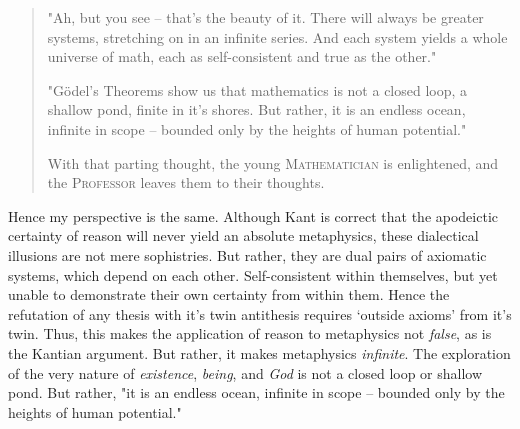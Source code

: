 \begin{quote}
  "Ah, but you see -- that's the beauty of it. There will always be greater systems, stretching on in an infinite series. And each system yields a whole universe of math, each as self-consistent and true as the other."

  "Gödel's Theorems show us that mathematics is not a closed loop, a shallow pond, finite in it's shores. But rather, it is an endless ocean, infinite in scope -- bounded only by the heights of human potential."

  With that parting thought, the young \textsc{Mathematician} is enlightened, and the \textsc{Professor} leaves them to their thoughts.
\end{quote}

\noindent
Hence my perspective is the same. Although Kant is correct that the apodeictic certainty of reason will never yield an absolute metaphysics, these dialectical illusions are not mere sophistries. But rather, they are dual pairs of axiomatic systems, which depend on each other. Self-consistent within themselves, but yet unable to demonstrate their own certainty from within them. Hence the refutation of any thesis with it's twin antithesis requires `outside axioms' from it's twin. Thus, this makes the application of reason to metaphysics not \emph{false}, as is the Kantian argument. But rather, it makes metaphysics \emph{infinite}. The exploration of the very nature of \emph{existence}, \emph{being}, and \emph{God} is not a closed loop or shallow pond. But rather, "it is an endless ocean, infinite in scope -- bounded only by the heights of human potential."

